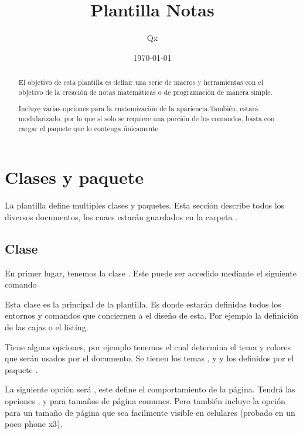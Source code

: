 \documentclass[theme=mocha, pagecolor=true, pagesize=a5paper]{qx-files/qx-notes}
\title{Plantilla Notas}
\author{Qx}
\date{\today}
\begin{document}
  \maketitle




  \begin{abstract}
    El objetivo de esta plantilla es definir una serie de macros y herramientas con el objetivo de la creación de notas matemáticas o de programación de manera simple.

    Incluye varias opciones para la customización de la apariencia.También, estará modularizado, por lo que si solo se requiere una porción de los comandos, basta con cargar el paquete que lo contenga únicamente.
  \end{abstract}



  \section{Clases y paquete}

  La plantilla define multiples clases y paquetes. Esta sección describe todos los diversos documentos, los cuaes estarán guardados en la carpeta .



  \subsection{Clase }

  En primer lugar, tenemos la clase . Este puede ser accedido mediante el siguiente comando

  Esta clase es la principal de la plantilla. Es donde estarán definidas todos los entornos y comandos que conciernen a el diseño de esta. Por ejemplo la definición de las cajas o el listing.

  Tiene alguns opciones, por ejemplo tenemos  el cual determina el tema y colores que serán usados por el documento. Se tienen los temas ,  y  y los definidos por el paquete .

  La siguiente opción será , este define el comportamiento de la página. Tendrá las opciones ,  y  para tamaños de página comunes. Pero también incluye la opción  para un tamaño de página que sea facilmente visible en celulares (probado en un poco phone x3).
\end{document}
